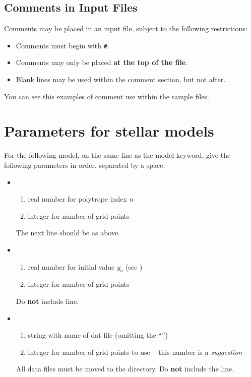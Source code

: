 \subsection{Comments in Input Files}
Comments may be placed in an input file, subject to the following restrictions:
\begin{itemize}
	\item Comments must begin with \verb+#+.
	\item Comments may only be placed {\bf at the top of the file}.
	\item Blank lines may be used within the comment section, but not after. 
\end{itemize}
You can see this examples of comment use within the sample files.

\section{Parameters for stellar models \label{sec:grpulse:params}}
For the following model, on the same line as the model keyword, give the following parameters in order, separated by a space.
\begin{itemize}
	\item {} 
		\begin{enumerate}
			\item real number for polytrope index $n$
			\item integer for number of grid points
		\end{enumerate} 
		The next line should be  as above.
	\item {} 
		\begin{enumerate}
			\item real number for initial value $y_o$ (see \hyperlink{class:CHWD}{})
			\item integer for number of grid points
		\end{enumerate}
		Do {\bf not} include  line.
	\item {}
		\begin{enumerate}
			\item string with name of dat file (omitting the ``'')
			\item integer for number of grid points to use -- this number is a \emph{suggestion}
		\end{enumerate}
		All  data files must be moved to the  directory.  
		Do {\bf not} include the  line.
\end{itemize}

